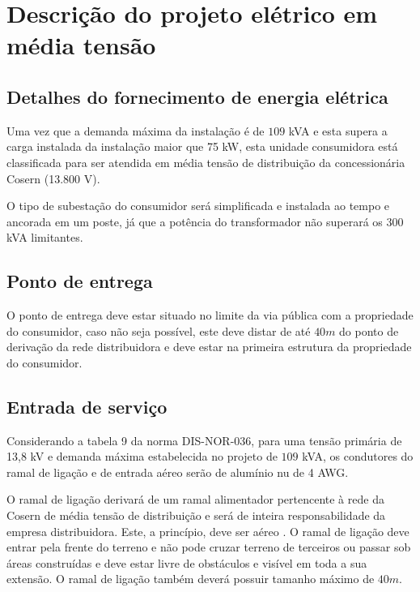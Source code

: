 \section{Descrição do projeto elétrico em média tensão}

\subsection{Detalhes do fornecimento de energia elétrica}

Uma vez que a demanda máxima da instalação é de $109$ kVA e esta supera a carga instalada da instalação maior que 75 kW, esta unidade consumidora está classificada para ser atendida em média tensão de distribuição da concessionária Cosern (13.800 V). 

O tipo de subestação do consumidor será simplificada e instalada ao tempo e ancorada em um poste, já que a potência do transformador não superará os $300$ kVA limitantes.

\subsection{Ponto de entrega}

O ponto de entrega deve estar situado no limite da via pública com a propriedade do consumidor, caso não seja possível, este deve distar de até $40 m$ do ponto de derivação da rede distribuidora e deve estar na primeira estrutura da propriedade do consumidor. 


\subsection{Entrada de serviço}

Considerando a tabela 9 da norma DIS-NOR-036, para uma tensão primária de 13,8 kV e demanda máxima estabelecida no projeto de $109$ kVA, os condutores do ramal de ligação e de entrada aéreo serão de alumínio nu de 4 AWG. 

O ramal de ligação derivará de um ramal alimentador pertencente à rede da Cosern de média tensão de distribuição e será de inteira responsabilidade da empresa distribuidora. Este, a princípio, deve ser aéreo%
. O ramal de ligação deve entrar pela frente do terreno e não pode cruzar terreno de terceiros ou passar sob áreas construídas e %
deve estar livre de obstáculos e visível em toda a sua extensão. O ramal de ligação também deverá possuir tamanho máximo de $40 m$.

